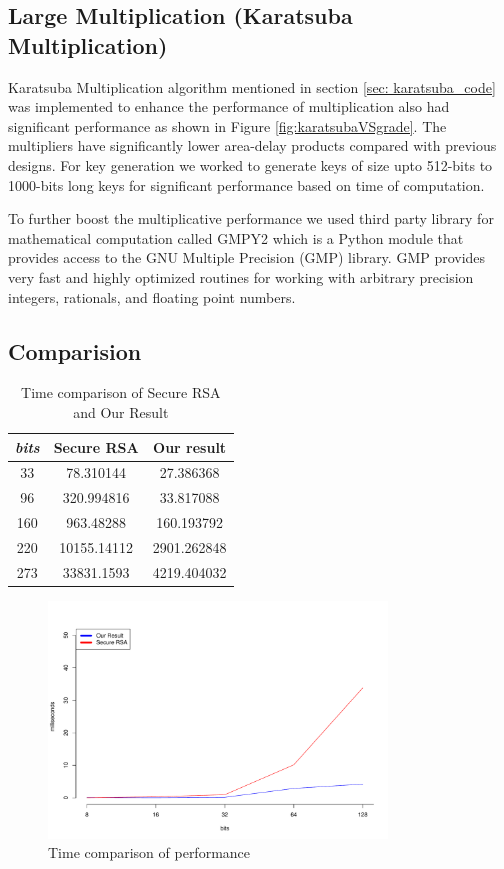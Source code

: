 \documentclass[12pt,journal,compsoc]{IEEEtran}
\begin{document}
\subsection{{Large Multiplication (Karatsuba Multiplication)}}
Karatsuba Multiplication\cite{karatsuba_multiplication} algorithm mentioned in section \ref{sec: karatsuba_code} was implemented to enhance the performance of multiplication also had significant performance as shown in Figure \ref{fig:karatsubaVSgrade}. The multipliers have significantly lower area-delay products compared with previous designs\cite{karatsuba_multiplication}. For key generation we worked to generate keys of size upto 512-bits to 1000-bits long keys for significant performance based on time of computation.

To further boost the multiplicative performance we used third party library for mathematical computation called GMPY2\cite{gmpy2} which is a Python module that provides access to the GNU Multiple Precision (GMP) library. GMP provides very fast and highly optimized routines for working with arbitrary precision integers, rationals, and floating point numbers.

\subsection{Comparision}
\begin{table}[ht]
	\begin{center}
	\begin{tabular}{|c|c|c|}
    	\hline
       		\emph{bits}	&		Secure RSA		&	Our result\\
	\hline
    		33			&	78.310144	&	27.386368\\
		96			&	320.994816	&	33.817088\\
		160			&	963.48288	&	160.193792\\
		220			&	10155.14112	&	2901.262848\\
		273			&	33831.1593	&	4219.404032\\
	\hline
	\end{tabular}
	\end{center}
	\caption{Time comparison of Secure RSA and Our Result}
	\label{table:rsaVSjava}
\end{table}

\begin{figure}[ht!]
\centering
\includegraphics[width=90mm]{images/rsaVSjava.pdf}
\caption{Time comparison of performance}
\label{fig:rsaVSjava}
\end{figure}
\end{document}
